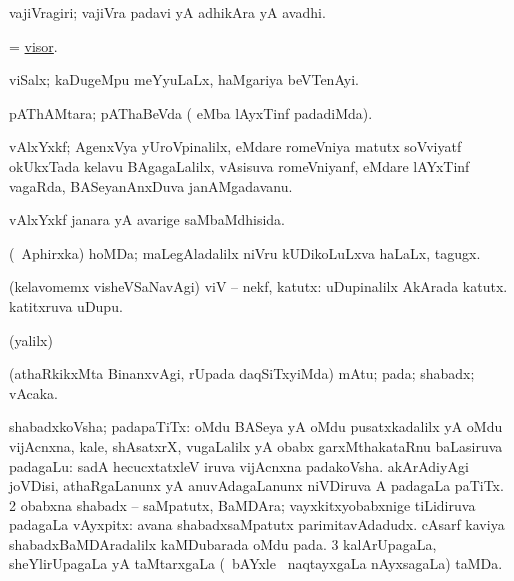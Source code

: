 \bentry
{} 
\gl{\nA}
\expl{}
\bmng
 vajiVragiri; vajiVra padavi yA adhikAra yA avadhi. 
\emng
\eentry

\bentry 
{} 
\gl{\nA}
\expl{}
\bmng
= \hyperlink{visor}{visor}. 
\emng
\eentry

\bentry
{} 
\gl{\nA}
\expl{}
\bmng
 viSalx; kaDugeMpu meYyuLaLx, haMgariya beVTenAyi. 
\emng
\eentry

\bentry 
{} 
\gl{\saMkiSx}
\expl{}
\bmng
 pAThAMtara; pAThaBeVda ( eMba lAyxTinf padadiMda). 
\emng
\eentry

\bentry
{} 
\gl{\nA}
\expl{}
\bmng
 vAlxYxkf; AgenxVya yUroVpinalilx, eMdare romeVniya matutx soVviyatf okUkxTada kelavu BAgagaLalilx, vAsisuva romeVniyanf, eMdare lAYxTinf vagaRda, BASeyanAnxDuva janAMgadavanu. 
\emng
\eentry

\bentry 
{} 
\gl{\gu}
\expl{}
\bmng
 vAlxYxkf janara yA avarige saMbaMdhisida. 
\emng
\eentry

\bentry 
{} 
\gl{\nA}
\expl{}
\bmng
 (\da\ Aphirxka) hoMDa; maLegAladalilx niVru kUDikoLuLxva haLaLx, tagugx. 
\emng
\eentry

\bentry
{}
\gl{\nA}
\expl{}
\bmng
(kelavomemx visheVSaNavAgi) viV -- nekf, katutx: 
\banum
{} uDupinalilx  AkArada katutx. 
  katitxruva uDupu. 
\eanum
\emng
\eentry

\bentry
{}
\gl{\saMkiSx}
\expl{}
\bmng
 (\UK yalilx) 
\emng
\eentry

\bentry
{} 
\gl{\nA}
\expl{}
\bmng
 (athaRkikxMta BinanxvAgi, rUpada daqSiTxyiMda) mAtu; pada; shabadx; vAcaka. 
\emng
\eentry

\bentry 
{} 
\gl{\nA}
\bmng
\bnum
{} shabadxkoVsha; padapaTiTx: 
\banum
{} oMdu BASeya yA oMdu pusatxkadalilx yA oMdu vijAcnxna, kale, shAsatxrX, \mo vugaLalilx yA obabx garxMthakataRnu baLasiruva padagaLu:  sadA hecucxtatxleV iruva vijAcnxna padakoVsha. 
 akArAdiyAgi joVDisi, athaRgaLanunx yA anuvAdagaLanunx niVDiruva A padagaLa paTiTx. 
\eanum
\numie
\num{2} obabxna shabadx -- saMpatutx, BaMDAra; vayxkitxyobabxnige tiLidiruva padagaLa vAyxpitx:  avana shabadxsaMpatutx parimitavAdadudx.  cAsarf kaviya shabadxBaMDAradalilx kaMDubarada oMdu pada. 
\num{3} kalArUpagaLa, sheYlirUpagaLa yA taMtarxgaLa (\kanmu\ bAYxle \mo\ naqtayxgaLa nAyxsagaLa) taMDa. 
\enum
\emng
\eentry

